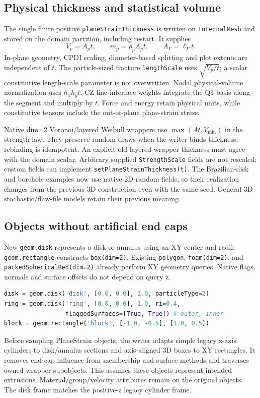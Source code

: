 \subsection{Physical thickness and statistical volume}
The single finite positive \texttt{planeStrainThickness} is written on
\texttt{InternalMesh} and stored on the domain partition, including restart.
It supplies
\[
 V_p=A_p t,\qquad m_p=\rho_p A_p t,\qquad
 A_\Gamma=\ell_\Gamma t.
\]
In-plane geometry, CPDI scaling, diameter-based splitting and plot extents are
independent of $t$. The particle-sized fracture \texttt{lengthScale} uses
$\sqrt{V_p/t}$; a scalar constitutive length-scale parameter is not overwritten.
Nodal physical-volume normalization uses $h_xh_yt$. CZ line-interface weights
integrate the Q1 basis along the segment and multiply by $t$. Force and energy
retain physical units, while constitutive tensors include the out-of-plane
plane-strain stress.

Native dim=2 Voronoi/layered Weibull wrappers use $\max(A t,V_{\min})$ in the
strength law. They preserve random draws when the writer binds thickness;
rebinding is idempotent. An explicit old layered-wrapper thickness must agree
with the domain scalar. Arbitrary supplied \texttt{StrengthScale} fields are
not rescaled; custom fields can implement \texttt{setPlaneStrainThickness(t)}.
The Brazilian-disk and borehole examples now use native 2D random fields, so
their realization changes from the previous 3D construction even with the same
seed. General 3D stochastic/flaw-file models retain their previous meaning.

\subsection{Objects without artificial end caps}
New \texttt{geom.disk} represents a disk or annulus using an XY center and radii;
\texttt{geom.rectangle} constructs \texttt{box(dim=2)}. Existing
\texttt{polygon}, \texttt{foam(dim=2)}, and
\texttt{packedSphericalBed(dim=2)} already perform XY geometry queries.
Native flags, normals and surface offsets do not depend on query z.
\begin{lstlisting}[language=Python]
disk = geom.disk('disk', [0.0, 0.0], 1.0, particleType=2)
ring = geom.disk('ring', [0.0, 0.0], 1.0, ri=0.4,
                 flaggedSurfaces=[True, True]) # outer, inner
block = geom.rectangle('block', [-1.0, -0.5], [1.0, 0.5])
\end{lstlisting}
Before sampling PlaneStrain objects, the writer adapts simple legacy z-axis
cylinders to disk/annulus sections and axis-aligned 3D boxes to XY rectangles.
It removes end-cap influence from membership and surface methods and traverses
owned wrapper subobjects. This assumes these objects represent intended
extrusions. Material/group/velocity attributes remain on the original objects.
The disk frame matches the positive-z legacy cylinder frame.

